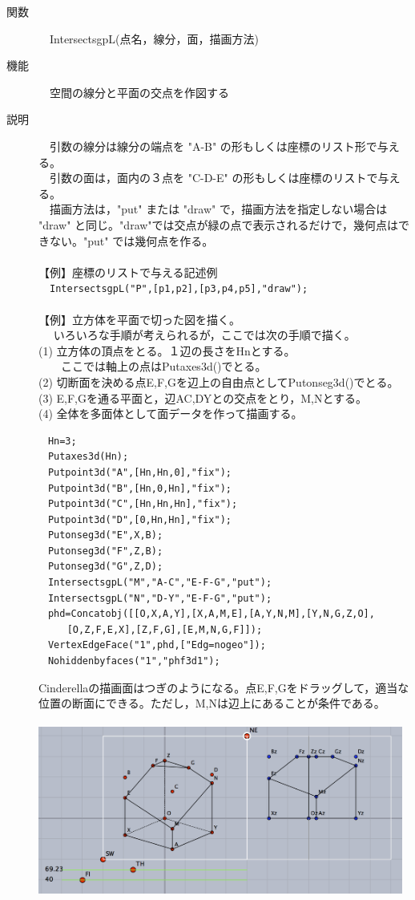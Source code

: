 \documentclass[papersize,a4paper,12pt,uplatex]{jsarticle}
\begin{document}
\begin{description}
\hypertarget{intersectsgpL}{}
\item[関数]　IntersectsgpL(点名，線分，面，描画方法)
\item[機能]　空間の線分と平面の交点を作図する
\item[説明]　引数の線分は線分の端点を "A-B" の形もしくは座標のリスト形で与える。\\
　引数の面は，面内の３点を "C-D-E" の形もしくは座標のリストで与える。\\
　描画方法は，"put" または "draw" で，描画方法を指定しない場合は "draw" と同じ。"draw"では交点が緑の点で表示されるだけで，幾何点はできない。"put" では幾何点を作る。\\
　\\
【例】座標のリストで与える記述例\\
　\verb|IntersectsgpL("P",[p1,p2],[p3,p4,p5],"draw");| \\
　\\
【例】立方体を平面で切った図を描く。\\
　 いろいろな手順が考えられるが，ここでは次の手順で描く。\\
 (1) 立方体の頂点をとる。１辺の長さをHnとする。\\
　　ここでは軸上の点はPutaxes3d()でとる。\\
(2) 切断面を決める点E,F,Gを辺上の自由点としてPutonseg3d()でとる。\\
(3) E,F,Gを通る平面と，辺AC,DYとの交点をとり，M,Nとする。\\
(4) 全体を多面体として面データを作って描画する。
\begin{verbatim}
　Hn=3;
　Putaxes3d(Hn);
　Putpoint3d("A",[Hn,Hn,0],"fix");
　Putpoint3d("B",[Hn,0,Hn],"fix");
　Putpoint3d("C",[Hn,Hn,Hn],"fix");
　Putpoint3d("D",[0,Hn,Hn],"fix");
　Putonseg3d("E",X,B); 
　Putonseg3d("F",Z,B); 
　Putonseg3d("G",Z,D); 
　IntersectsgpL("M","A-C","E-F-G","put"); 
　IntersectsgpL("N","D-Y","E-F-G","put"); 
　phd=Concatobj([[O,X,A,Y],[X,A,M,E],[A,Y,N,M],[Y,N,G,Z,O],
　　　[O,Z,F,E,X],[Z,F,G],[E,M,N,G,F]]);
　VertexEdgeFace("1",phd,["Edg=nogeo"]);
　Nohiddenbyfaces("1","phf3d1"); 
\end{verbatim}
Cinderellaの描画面はつぎのようになる。点E,F,Gをドラッグして，適当な位置の断面にできる。ただし，M,Nは辺上にあることが条件である。
\\
　\\
\includegraphics[bb=0 0 1426 654 , width=12cm]{Fig3d/IntersectsgpL0.png}\\


\end{description}
\end{document}

